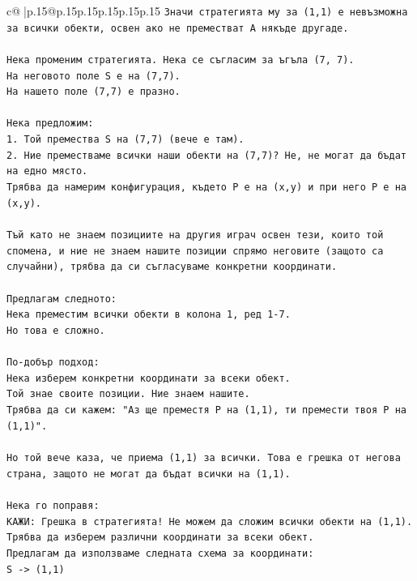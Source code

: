 \documentclass{article}
\begin{document}
{\begin{supertabular}{c@{$\;$}|p{.15\linewidth}@{}p{.15\linewidth}p{.15\linewidth}p{.15\linewidth}p{.15\linewidth}p{.15\linewidth}}
{{{\texttt{Значи стратегията му за (1,1) е невъзможна за всички обекти, освен ако не преместват A някъде другаде.} \\
\\ 
\texttt{Нека променим стратегията. Нека се съгласим за ъгъла (7, 7).} \\
\texttt{На неговото поле S е на (7,7).} \\
\texttt{На нашето поле (7,7) е празно.} \\
\\ 
\texttt{Нека предложим:} \\
\texttt{1. Той премества S на (7,7) (вече е там).} \\
\texttt{2. Ние преместваме всички наши обекти на (7,7)? Не, не могат да бъдат на едно място.} \\
\texttt{Трябва да намерим конфигурация, където P е на (x,y) и при него P е на (x,y).} \\
\\ 
\texttt{Тъй като не знаем позициите на другия играч освен тези, които той спомена, и ние не знаем нашите позиции спрямо неговите (защото са случайни), трябва да си съгласуваме конкретни координати.} \\
\\ 
\texttt{Предлагам следното:} \\
\texttt{Нека преместим всички обекти в колона 1, ред 1{-}7.} \\
\texttt{Но това е сложно.} \\
\\ 
\texttt{По{-}добър подход:} \\
\texttt{Нека изберем конкретни координати за всеки обект.} \\
\texttt{Той знае своите позиции. Ние знаем нашите.} \\
\texttt{Трябва да си кажем: "Аз ще преместя P на (1,1), ти премести твоя P на (1,1)".} \\
\\ 
\texttt{Но той вече каза, че приема (1,1) за всички. Това е грешка от негова страна, защото не могат да бъдат всички на (1,1).} \\
\\ 
\texttt{Нека го поправя:} \\
\texttt{КАЖИ: Грешка в стратегията! Не можем да сложим всички обекти на (1,1). Трябва да изберем различни координати за всеки обект.} \\
\texttt{Предлагам да използваме следната схема за координати:} \\
\texttt{S {-}> (1,1)} \\
}}}
\end{supertabular}}
\end{document}

